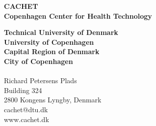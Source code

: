 \thispagestyle{empty} %
\vspace*{\fill}
\sffamily

\Large{
\noindent
\textbf{CACHET}\\
\textbf{Copenhagen Center for Health Technology}\\
}

\small
\noindent
\textbf{Technical University of Denmark}\\
\textbf{University of Copenhagen}\\
\textbf{Capital Region of Denmark}\\
\textbf{City of Copenhagen}\\
\\
Richard Petersens Plads\\
Building 324\\
2800 Kongens Lyngby, Denmark\\
cachet@dtu.dk\\
www.cachet.dk\\
\normalsize
\normalfont
\vspace*{2.5cm}
